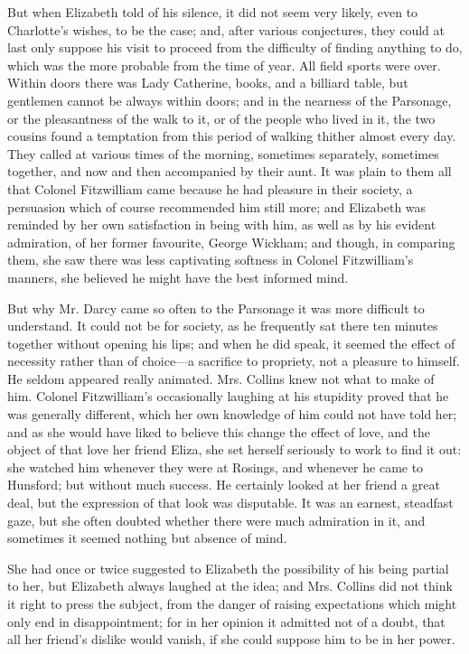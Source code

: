 \documentclass[10pt]{book}
\begin{document}
   But when Elizabeth told of his silence, it did not seem very likely,
even to Charlotte’s wishes, to be the case; and, after various
conjectures, they could at last only suppose his visit to proceed from
the difficulty of finding anything to do, which was the more probable
from the time of year. All field sports were over. Within doors there
was Lady Catherine, books, and a billiard table, but gentlemen cannot be
always within doors; and in the nearness of the Parsonage, or the
pleasantness of the walk to it, or of the people who lived in it, the
two cousins found a temptation from this period of walking thither
almost every day. They called at various times of the morning, sometimes
separately, sometimes together, and now and then accompanied by their
aunt. It was plain to them all that Colonel Fitzwilliam came because he
had pleasure in their society, a persuasion which of course recommended
him still more; and Elizabeth was reminded by her own satisfaction in
being with him, as well as by his evident admiration, of her former
favourite, George Wickham; and though, in comparing them, she saw there
was less captivating softness in Colonel Fitzwilliam’s manners, she
believed he might have the best informed mind.
  

   But why Mr. Darcy came so often to the Parsonage it was more difficult
to understand. It could not be for society, as he frequently sat there
ten minutes together without opening his lips; and when he did speak, it
seemed the effect of necessity rather than of choice—a sacrifice to
propriety, not a pleasure to himself. He
   seldom appeared really
animated. Mrs. Collins knew not what to make of him. Colonel
Fitzwilliam’s occasionally laughing at his stupidity proved that he was
generally different, which her own knowledge of him could not have told
her; and as she would have liked to believe this change the effect of
love, and the object of that love her friend Eliza, she set herself
seriously to work to find it out: she watched him whenever they were at
Rosings, and whenever he came to Hunsford; but without much success. He
certainly looked at her friend a great deal, but the expression of that
look was disputable. It was an earnest, steadfast gaze, but she often
doubted whether there were much admiration in it, and sometimes it
seemed nothing but absence of mind.
  

   She had once or twice suggested to Elizabeth the possibility of his
being partial to her, but Elizabeth always laughed at the idea; and Mrs.
Collins did not think it right to press the subject, from the danger of
raising expectations which might only end in disappointment; for in her
opinion it admitted not of a doubt, that all her friend’s dislike would
vanish, if she could suppose him to be in her power.
  
\end{document}
